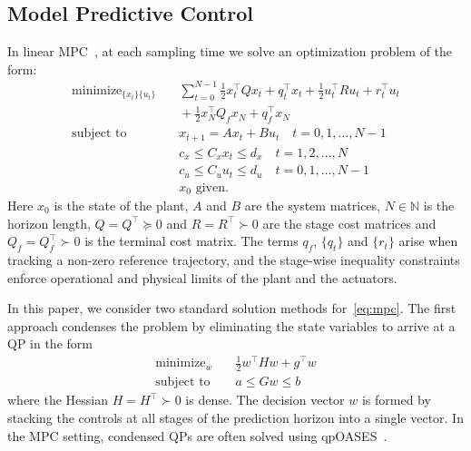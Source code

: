\documentclass[letterpaper, 10 pt, conference]{ieeeconf}  %
\DeclareMathOperator*{\minimize}{minimize}
\begin{document}
\subsection{Model Predictive Control}
In linear MPC~\cite{borrelli2017predictive}, at each sampling time we solve an optimization problem of the form:
\begin{equation}
\label{eq:mpc}
\begin{aligned}
    \minimize_{\{x_t\}\{u_t\}} &\quad \sum_{t=0}^{N-1} \frac{1}{2} x_t^{\top} Q x_t + q_t^{\top} x_t + \frac{1}{2} u_t^{\top}R u_t + r_t^{\top} u_t\\
    &\quad + \frac{1}{2} x_N^{\top} Q_f x_N + q_f^{\top}x_N \\
    \text{subject to} &\quad x_{t+1} = A x_t + B u_t \quad t=0,1,\dots,N-1 \\
    &\quad c_x \leq C_x x_t \leq d_x \quad t=1,2,\dots, N\\ 
    &\quad c_u \leq C_u u_t \leq d_u \quad t=0,1,\dots,N-1 \\
    &\quad x_0 \text{ given.}
\end{aligned}
\end{equation}
Here $x_0$ is the state of the plant, $A$ and $B$ are the system matrices, $N \in \mathbb{N}$ is the horizon length, $Q=Q^{\top} \succeq 0$ and $R=R^{\top}\succ0$ are the stage cost matrices and $Q_f = Q_f^{\top}\succ0$ is the terminal cost matrix. The terms $q_f$, $\{q_t\}$ and $\{r_t\}$ arise when tracking a non-zero reference trajectory, and the stage-wise inequality constraints enforce operational and physical limits of the plant and the actuators.

In this paper, we consider two standard solution methods for~\eqref{eq:mpc}.
The first approach condenses the problem by eliminating the state variables to arrive at a QP in the form
\begin{equation}
\label{eq:dense_qp}
\begin{aligned}
    \minimize_w &\quad \frac{1}{2}w^{\top} H w + g^{\top} w \\
    \text{subject to} &\quad a \leq Gw \leq b
\end{aligned}
\end{equation}
where the Hessian $H = H^{\top} \succ 0$ is dense. The decision vector $w$ is formed by stacking 
the controls at all stages of the prediction horizon into a single vector. In the MPC setting, condensed QPs are often solved using qpOASES~\cite{Ferreau2014}.
\end{document}
